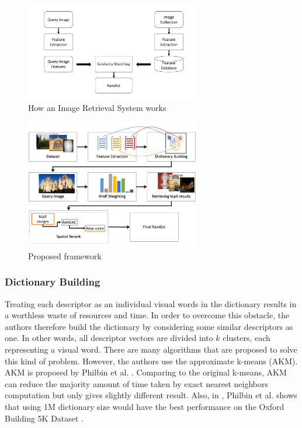 \begin{figure}
    \centering
    \includegraphics[width=3.0in]{ImageRetrievalSystem.pdf}
    \caption{How an Image Retrieval System works}
    \label{fig:image_retrieval_system}
\end{figure}

\begin{figure}
    \centering
    \includegraphics[width=3.0in]{process.pdf}
    \caption{Proposed framework}
    \label{fig:proposed_framework}
\end{figure}

\subsubsection{Dictionary Building} \label{section:dictionary_building}
Treating each descriptor as an individual visual words in the dictionary results in a worthless waste of resources and time. In order to overcome this obstacle, the authors therefore build the dictionary by considering some similar descriptors as one. In other words, all descriptor vectors are divided into $k$ clusters, each representing a visual word. There are many algorithms that are proposed to solve this kind of problem. However, the authors use the approximate k-means (AKM). AKM is proposed by Philbin et al. \cite{2}. Comparing to the original k-means, AKM can reduce the majority amount of time taken by exact nearest neighbors computation but only gives slightly different result. Also, in \cite{2}, Philbin et al. shows that using 1M dictionary size would have the best performance on the Oxford Building 5K Dataset \cite{oxbuilding}.


